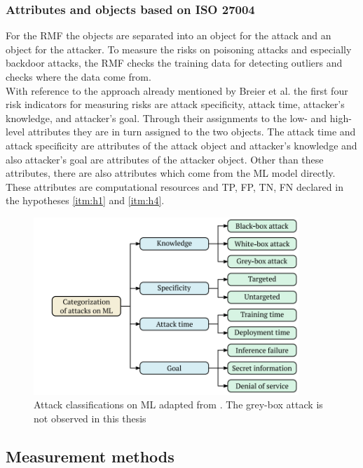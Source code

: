 \subsubsection*{Attributes and objects based on ISO 27004}

For the RMF the objects are separated into an object for the attack and an object for the attacker. To measure the risks on poisoning attacks and especially backdoor attacks, the RMF checks the training data for detecting outliers and checks where the data come from. \\ With reference to the approach already mentioned by Breier et al. \cite{DBLP:journals/corr/abs-2012-04884} the first four risk indicators for measuring risks are attack specificity, attack time, attacker's knowledge, and attacker's goal. Through their assignments to the low- and high-level attributes they are in turn assigned to the two objects. The attack time and attack specificity are attributes of the attack object and attacker's knowledge and also attacker's goal are attributes of the attacker object. Other than these attributes, there are also attributes which come from the ML model directly. These attributes are computational resources and TP, FP, TN, FN declared in the hypotheses \ref{itm:h1} and \ref{itm:h4}.

\begin{figure}[ht!]
  \centering
  \includegraphics[width=10cm]{pictures/classifi_attacks_ml.png}
  \caption{Attack classifications on ML adapted from \cite{DBLP:journals/corr/abs-2012-04884}. The grey-box attack is not observed in this thesis}
  \label{fig:classifi_attacks_ml}
\end{figure}

\subsection{Measurement methods}

